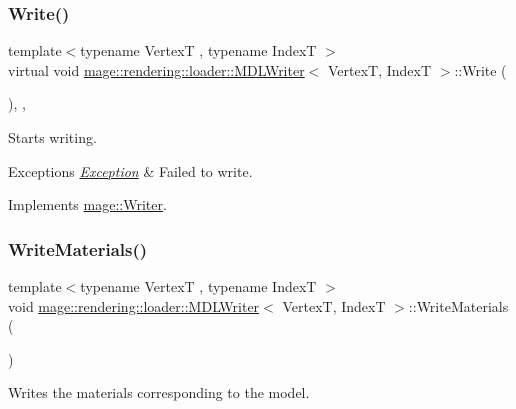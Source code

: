 \subsubsection{\texorpdfstring{Write()}{Write()}}
{\footnotesize\ttfamily template$<$typename VertexT , typename IndexT $>$ \\
virtual void \mbox{\hyperlink{classmage_1_1rendering_1_1loader_1_1_m_d_l_writer}{mage\+::rendering\+::loader\+::\+M\+D\+L\+Writer}}$<$ VertexT, IndexT $>$\+::Write (\begin{DoxyParamCaption}{ }\end{DoxyParamCaption})\hspace{0.3cm}{\ttfamily [override]}, {\ttfamily [private]}, {\ttfamily [virtual]}}

Starts writing.


\begin{DoxyExceptions}{Exceptions}
{\em \mbox{\hyperlink{classmage_1_1_exception}{Exception}}} & Failed to write. \\
\hline
\end{DoxyExceptions}


Implements \mbox{\hyperlink{classmage_1_1_writer_a9baf695ef7f6180bef883f60bcb3ac07}{mage\+::\+Writer}}.

\mbox{\label{classmage_1_1rendering_1_1loader_1_1_m_d_l_writer_afcd1eca27b5854b0f0406dbcae135499}} 
\subsubsection{\texorpdfstring{Write\+Materials()}{WriteMaterials()}}
{\footnotesize\ttfamily template$<$typename VertexT , typename IndexT $>$ \\
void \mbox{\hyperlink{classmage_1_1rendering_1_1loader_1_1_m_d_l_writer}{mage\+::rendering\+::loader\+::\+M\+D\+L\+Writer}}$<$ VertexT, IndexT $>$\+::Write\+Materials (\begin{DoxyParamCaption}{ }\end{DoxyParamCaption})\hspace{0.3cm}{\ttfamily [private]}}

Writes the materials corresponding to the model.


